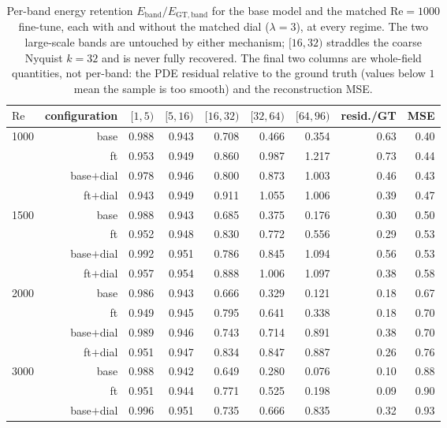 \begin{table}[t]
  \centering
  \caption{Per-band energy retention $E_{\mathrm{band}}/E_{\mathrm{GT,band}}$ for the base model and the matched $\mathrm{Re}=1000$ fine-tune, each with and without the matched dial ($\lambda=3$), at every regime. The two large-scale bands are untouched by either mechanism; $[16,32)$ straddles the coarse Nyquist $k=32$ and is never fully recovered. The final two columns are whole-field quantities, not per-band: the PDE residual relative to the ground truth (values below $1$ mean the sample is too smooth) and the reconstruction MSE.}
  \label{tab:perband-all}
  \begin{tabular}{lrrrrrrrr}
    \toprule
    $\mathrm{Re}$ & configuration & $[1,5)$ & $[5,16)$ & $[16,32)$ & $[32,64)$ & $[64,96)$ & resid./GT & MSE \\
    \midrule
    \multirow{4}{*}{1000} & base & 0.988 & 0.943 & 0.708 & 0.466 & 0.354 & 0.63 & 0.40 \\
     & ft & 0.953 & 0.949 & 0.860 & 0.987 & 1.217 & 0.73 & 0.44 \\
     & base$+$dial & 0.978 & 0.946 & 0.800 & 0.873 & 1.003 & 0.46 & 0.43 \\
     & ft$+$dial & 0.943 & 0.949 & 0.911 & 1.055 & 1.006 & 0.39 & 0.47 \\
    \midrule
    \multirow{4}{*}{1500} & base & 0.988 & 0.943 & 0.685 & 0.375 & 0.176 & 0.30 & 0.50 \\
     & ft & 0.952 & 0.948 & 0.830 & 0.772 & 0.556 & 0.29 & 0.53 \\
     & base$+$dial & 0.992 & 0.951 & 0.786 & 0.845 & 1.094 & 0.56 & 0.53 \\
     & ft$+$dial & 0.957 & 0.954 & 0.888 & 1.006 & 1.097 & 0.38 & 0.58 \\
    \midrule
    \multirow{4}{*}{2000} & base & 0.986 & 0.943 & 0.666 & 0.329 & 0.121 & 0.18 & 0.67 \\
     & ft & 0.949 & 0.945 & 0.795 & 0.641 & 0.338 & 0.18 & 0.70 \\
     & base$+$dial & 0.989 & 0.946 & 0.743 & 0.714 & 0.891 & 0.38 & 0.70 \\
     & ft$+$dial & 0.951 & 0.947 & 0.834 & 0.847 & 0.887 & 0.26 & 0.76 \\
    \midrule
    \multirow{4}{*}{3000} & base & 0.988 & 0.942 & 0.649 & 0.280 & 0.076 & 0.10 & 0.88 \\
     & ft & 0.951 & 0.944 & 0.771 & 0.525 & 0.198 & 0.09 & 0.90 \\
     & base$+$dial & 0.996 & 0.951 & 0.735 & 0.666 & 0.835 & 0.32 & 0.93 \\

\end{tabular}
\end{table}
